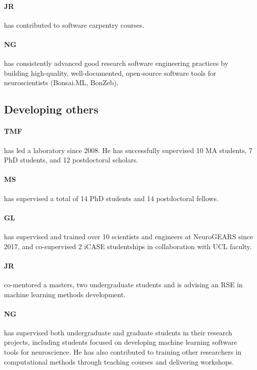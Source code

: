 \paragraph{JR} has contributed to software carpentry courses.

\paragraph{NG} has consistently advanced good research software engineering practices by building high-quality, well-documented, open-source software tools for neuroscientists (Bonsai.ML, BonZeb).


\subsection{Developing others}

\paragraph{TMF} has led a laboratory since 2008. He has
successfully supervised 10 MA students, 7 PhD students, and 12 postdoctoral
scholars.

\paragraph{MS} has supervised a total of 14 PhD students and
14 postdoctoral fellows.

\paragraph{GL} has supervised and trained over 10 scientists and engineers at NeuroGEARS since 2017, and co-supervised 2 iCASE studentships in collaboration with UCL faculty.

\paragraph{JR} co-mentored a masters, two undergraduate
students and is advising an RSE in machine learning methods development.

\paragraph{NG} has supervised both undergraduate and graduate students in their research projects, including students focused on developing machine learning software tools for neuroscience. He has also contributed to training other researchers in computational methods through teaching courses and delivering workshops.